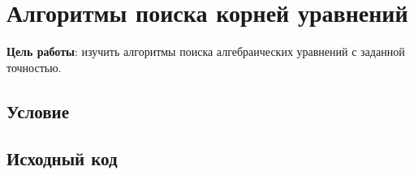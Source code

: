 
\usepackage{minted}





\section{Алгоритмы поиска корней уравнений}

\textbf{Цель работы}: изучить алгоритмы поиска алгебраических уравнений с заданной точностью.

\subsection{Условие}



\subsection{Исходный код}
\inputminted[fontsize=\footnotesize]{c}{../task.c}



